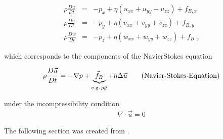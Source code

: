 \documentclass[letterpaper,10pt,english]{sphinxmanual}
\begin{document}
\sphinxAtStartPar
\begin{eqnarray}
\rho \frac{Du}{Dt}&=&-p_x+\eta (u_{xx}+u_{yy}+u_{zz})+f_{B,x}\\
\rho \frac{Dv}{Dt}&=&-p_y+\eta (v_{xx}+v_{yy}+v_{zz})+f_{B,y}\\
\rho \frac{Dw}{Dt}&=&-p_z+\eta (w_{xx}+w_{yy}+w_{zz})+f_{B,z}
\end{eqnarray}

\sphinxAtStartPar
which corresponds to the components of the Navier\sphinxhyphen{}Stokes equation

\sphinxAtStartPar
\begin{equation}
\rho\frac{D\vec{u}}{Dt}=-\nabla p + \underbrace{ \vec{f}_{B}}_{{\rm e.g. \,}\rho \vec{g}}+\eta \Delta \vec{u} \tag {Navier-Stokes-Equation}
\end{equation}

\sphinxAtStartPar
under the incompressibility condition
\begin{equation*}
\begin{split}\nabla \cdot \vec{u}=0 \tag{incompressibility condition}\end{split}
\end{equation*}


\sphinxAtStartPar
The following section was created from .
\end{document}
